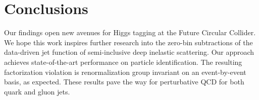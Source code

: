 \section{Conclusions}\label{sec:conclusions}

Our findings open new avenues for Higgs tagging at the Future Circular
Collider. We hope this work inspires further research into the zero-bin
subtractions of the data-driven jet function of semi-inclusive deep
inelastic scattering. Our approach achieves state-of-the-art performance
on particle identification. The resulting factorization violation is
renormalization group invariant on an event-by-event basis, as expected.
These results pave the way for perturbative QCD for both quark and gluon
jets.

